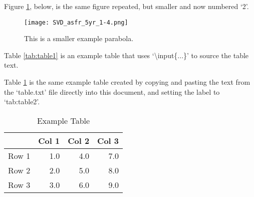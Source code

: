 \documentclass[11pt,letterpaper]{article}
\begin{document}
Figure \ref{fig:asfr2}, below, is the same figure repeated, but smaller and now numbered `2'. \lipsum[2]

\begin{figure}[htbp]
\begin{center}
\texttt{[image: SVD\_asfr\_5yr\_1-4.png]}
\caption{This is a smaller example parabola.}
\label{fig:asfr2}
\end{center}
\end{figure}

Table \ref{tab:table1} is an example table that uses `\textbackslash input\{...\}' to source the table text. \lipsum[0.5]



Table \ref{tab:table2} is the same example table created by copying and pasting the text from the `table.txt' file directly into this document, and setting the label to `tab:table2'.

\begin{table}[ht]
\centering
\begin{tabular}{rrrr}
  \hline
 & Col 1 & Col 2 & Col 3 \\ 
  \hline
Row 1 & 1.0 & 4.0 & 7.0 \\ 
  Row 2 & 2.0 & 5.0 & 8.0 \\ 
  Row 3 & 3.0 & 6.0 & 9.0 \\ 
   \hline
\end{tabular}
\caption{Example Table} 
\label{tab:table2}
\end{table}


    
\end{document}
